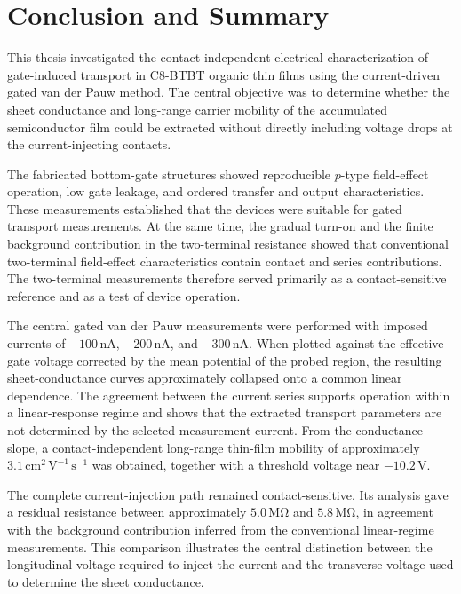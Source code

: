 \chapter{Conclusion and Summary}

This thesis investigated the contact-independent electrical characterization
of gate-induced transport in C8-BTBT organic thin films using the
current-driven gated van der Pauw method. The central objective was to determine
whether the sheet conductance and long-range carrier mobility of the accumulated
semiconductor film could be extracted without directly including voltage drops
at the current-injecting contacts.

The fabricated bottom-gate structures showed reproducible $p$-type
field-effect operation, low gate leakage, and ordered transfer and output
characteristics.
These measurements established that the devices were suitable for gated
transport measurements. At the same time, the gradual turn-on and the finite
background contribution in the two-terminal resistance showed that conventional
two-terminal field-effect characteristics contain contact and series
contributions. The
two-terminal measurements therefore served primarily as a contact-sensitive
reference and as a test of device operation.

The central gated van der Pauw measurements were performed with imposed
currents of $-100\,\mathrm{nA}$, $-200\,\mathrm{nA}$, and
$-300\,\mathrm{nA}$. When plotted against the effective gate voltage corrected
by the mean potential of the probed region, the resulting sheet-conductance
curves approximately collapsed onto a common linear dependence. The agreement
between the current series supports operation within a linear-response regime
and shows that the extracted transport parameters are not determined by the
selected measurement current. From the conductance slope, a
contact-independent long-range thin-film mobility of approximately
$3.1\,\mathrm{cm^2\,V^{-1}\,s^{-1}}$ was obtained, together with a threshold
voltage near $-10.2\,\mathrm{V}$.

The complete current-injection path remained contact-sensitive. Its analysis
gave a residual resistance between approximately $5.0\,\mathrm{M\Omega}$ and
$5.8\,\mathrm{M\Omega}$, in agreement with the background contribution inferred
from the conventional linear-regime measurements. This comparison illustrates
the central distinction between the longitudinal voltage required to inject the
current and the transverse voltage used to determine the sheet conductance.

